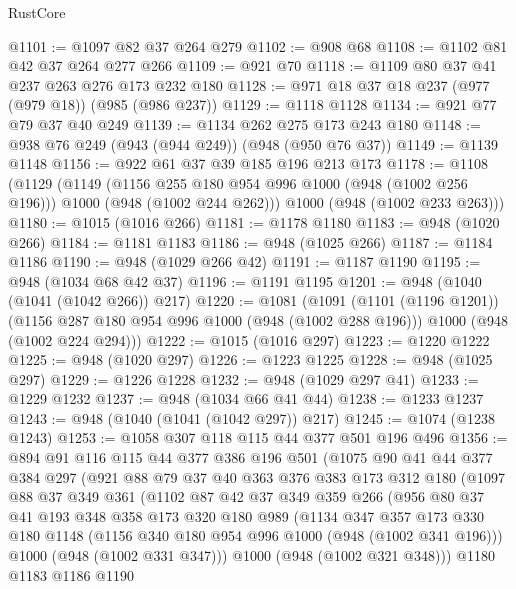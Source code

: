 \begin{lexlean}{RustCore}
\begin{coremodule}
@1101 := @1097 @82 @37 @264 @279
@1102 := @908 @68
@1108 := @1102 @81 @42 @37 @264 @277 @266
@1109 := @921 @70
@1118 := @1109 @80 @37 @41 @237 @263 @276 @173 @232 @180
@1128 := @971 @18 @37 @18 @237 (@977 (@979 @18)) (@985 (@986 @237))
@1129 := @1118 @1128
@1134 := @921 @77 @79 @37 @40 @249
@1139 := @1134 @262 @275 @173 @243 @180
@1148 := @938 @76 @249 (@943 (@944 @249)) (@948 (@950 @76 @37))
@1149 := @1139 @1148
@1156 := @922 @61 @37 @39 @185 @196 @213 @173
@1178 := @1108
    (@1129
      (@1149
        (@1156 @255 @180 @954 @996 @1000 (@948 (@1002 @256 @196)))
        @1000
        (@948 (@1002 @244 @262)))
      @1000
      (@948 (@1002 @233 @263)))
@1180 := @1015 (@1016 @266)
@1181 := @1178 @1180
@1183 := @948 (@1020 @266)
@1184 := @1181 @1183
@1186 := @948 (@1025 @266)
@1187 := @1184 @1186
@1190 := @948 (@1029 @266 @42)
@1191 := @1187 @1190
@1195 := @948 (@1034 @68 @42 @37)
@1196 := @1191 @1195
@1201 := @948 (@1040 (@1041 (@1042 @266)) @217)
@1220 := @1081
    (@1091
      (@1101 (@1196 @1201))
      (@1156 @287 @180 @954 @996 @1000 (@948 (@1002 @288 @196)))
      @1000
      (@948 (@1002 @224 @294)))
@1222 := @1015 (@1016 @297)
@1223 := @1220 @1222
@1225 := @948 (@1020 @297)
@1226 := @1223 @1225
@1228 := @948 (@1025 @297)
@1229 := @1226 @1228
@1232 := @948 (@1029 @297 @41)
@1233 := @1229 @1232
@1237 := @948 (@1034 @66 @41 @44)
@1238 := @1233 @1237
@1243 := @948 (@1040 (@1041 (@1042 @297)) @217)
@1245 := @1074 (@1238 @1243)
@1253 := @1058 @307 @118 @115 @44 @377 @501 @196 @496
@1356 := @894
    @91
    @116
    @115
    @44
    @377
    @386
    @196
    @501
    (@1075
      @90
      @41
      @44
      @377
      @384
      @297
      (@921
        @88
        @79
        @37
        @40
        @363
        @376
        @383
        @173
        @312
        @180
        (@1097
          @88
          @37
          @349
          @361
          (@1102
            @87
            @42
            @37
            @349
            @359
            @266
            (@956
              @80
              @37
              @41
              @193
              @348
              @358
              @173
              @320
              @180
              @989
              (@1134
                @347
                @357
                @173
                @330
                @180
                @1148
                (@1156 @340 @180 @954 @996 @1000 (@948 (@1002 @341 @196)))
                @1000
                (@948 (@1002 @331 @347)))
              @1000
              (@948 (@1002 @321 @348)))
            @1180
            @1183
            @1186
            @1190

\end{coremodule}
\end{lexlean}
